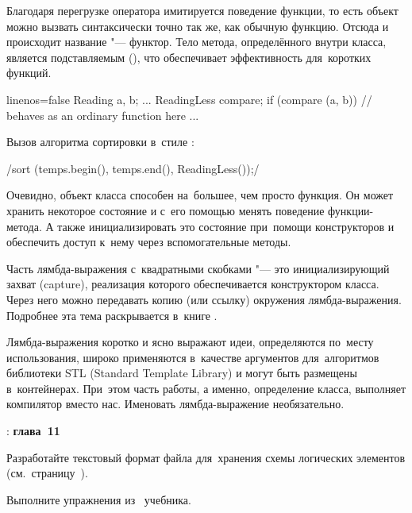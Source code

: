 Благодаря перегрузке оператора \code{()} имитируется поведение функции, то есть объект можно вызвать синтаксически точно так же, как обычную функцию. Отсюда и происходит название "--- функтор. Тело метода, определённого внутри класса, является подставляемым (), что обеспечивает эффективность для~коротких функций.

\begin{cppcode*}{linenos=false}
Reading a, b;
...
ReadingLess compare;
if (compare (a, b))  // behaves as an ordinary function here
  ...
\end{cppcode*}

\noindent
Вызов алгоритма сортировки в~стиле :

\cpp/sort (temps.begin(), temps.end(), ReadingLess());/

Очевидно, объект класса способен на~большее, чем просто функция. Он может хранить некоторое состояние и с~его помощью менять поведение функции-метода. А также инициализировать это состояние при~помощи конструкторов и обеспечить доступ к~нему через вспомогательные методы.

Часть лямбда-выражения с~квадратными скобками \code{[]} "--- это инициализирующий захват (\textenglish{capture}), реализация которого обеспечивается конструктором класса. Через него можно передавать копию (или ссылку) окружения лямбда-выражения. Подробнее эта тема раскрывается в~книге \cite{Stroustrup:2013:en}.

Лямбда-выражения коротко и ясно выражают идеи, определяются по~месту использования, широко применяются в~качестве аргументов для~алгоритмов библиотеки STL (\textenglish{Standard Template Library}) и могут быть размещены в~контейнерах. При~этом часть работы, а именно, определение класса, выполняет компилятор вместо нас. Именовать лямбда-выражение необязательно.



\WhatToReadSection
\textcite{Stroustrup:2016:ru}: \textbf{глава~11}



\ExercisesSection
\begin{exercise}
    \item Разработайте текстовый формат файла для~хранения схемы логических элементов (см.~страницу~\pageref{par:logic:v1}).

    \item Выполните упражнения из~ учебника.
\end{exercise}
